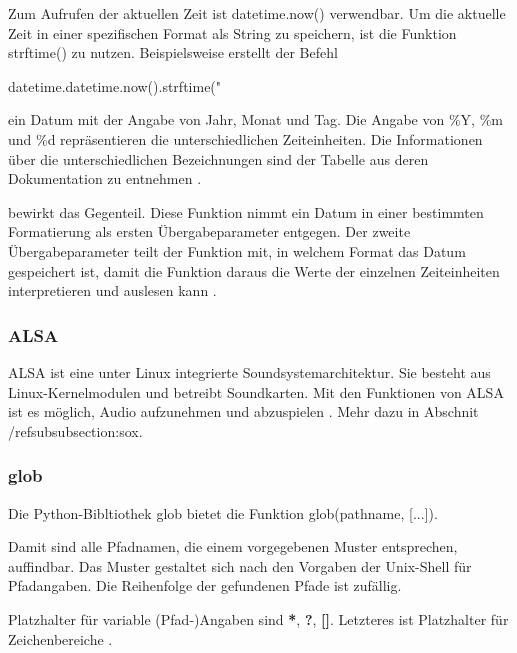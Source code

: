 Zum Aufrufen der aktuellen Zeit ist datetime.now() verwendbar. Um die aktuelle Zeit in einer spezifischen Format als String zu speichern, ist die Funktion strftime() zu nutzen. Beispielsweise erstellt der Befehl 
\begin{python}
datetime.datetime.now().strftime("%
\end{python} 
ein Datum mit der Angabe von Jahr, Monat und Tag. Die Angabe von \%Y, \%m und \%d repräsentieren die unterschiedlichen Zeiteinheiten. Die Informationen über die unterschiedlichen Bezeichnungen sind der Tabelle aus deren Dokumentation zu entnehmen \cite{datetime_doc}.

 bewirkt das Gegenteil. Diese Funktion nimmt ein Datum in einer bestimmten Formatierung als ersten Übergabeparameter entgegen. Der zweite Übergabeparameter teilt der Funktion mit, in welchem Format das Datum gespeichert ist, damit die Funktion daraus die Werte der einzelnen Zeiteinheiten interpretieren und auslesen kann \cite{datetime_doc}.



\subsubsection{ALSA}
\label{subsubsec:alsa}
ALSA ist eine unter Linux integrierte Soundsystemarchitektur. Sie besteht aus Linux-Kernelmodulen und betreibt Soundkarten. 
Mit den Funktionen von ALSA ist es möglich, Audio aufzunehmen und abzuspielen \cite{alsa_doc}. Mehr dazu in Abschnit /ref{subsubsection:sox}.

\subsubsection{glob}
\label{subsubsec:glob}

Die Python-Bibltiothek glob bietet die Funktion glob(pathname, [...]).

Damit sind alle Pfadnamen, die einem vorgegebenen Muster entsprechen, auffindbar. Das Muster gestaltet sich nach den Vorgaben der Unix-Shell für Pfadangaben. Die Reihenfolge der gefundenen Pfade ist zufällig.

Platzhalter für variable (Pfad-)Angaben sind \textbf{*}, \textbf{?}, \textbf{[]}. Letzteres ist Platzhalter für Zeichenbereiche \cite{glob_doc}.


